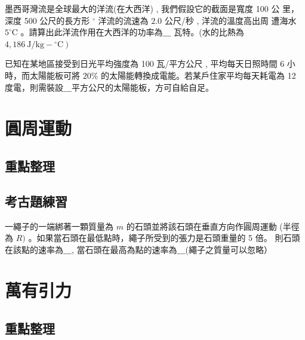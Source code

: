 \documentclass[cn,10pt,math=newtx,chinesefont=founder]{../elegantbook}
\begin{document}
\begin{example}
    墨西哥灣流是全球最大的洋流(在大西洋) , 我們假設它的截面是寬度 100 公 里，深度 500 公尺的長方形 $^{\circ}$ 洋流的流速為 $2.0$ 公尺/秒 , 洋流的溫度高出周 遭海水 $5^{\circ} \mathrm{C}$ 。請算出此洋流作用在大西洋的功率為$\_\_\_$ 瓦特。(水的比熱為 $\left.4,186 \mathrm{~J} / \mathrm{kg}-{ }^{\circ} \mathrm{C}\right)$
\end{example}
\begin{solution}

\end{solution}
\vspace{6cm}

\begin{example}
     已知在某地區接受到日光平均強度為 100 瓦/平方公尺 , 平均每天日照時間 6 小時，而太陽能板可將 $20 \%$ 的太陽能轉換成電能。若某戶住家平均每天耗電為 12 度電，則需裝設$\_\_\_$平方公尺的太陽能板，方可自給自足。
\end{example}
\begin{solution}
    
\end{solution}
\vspace{6cm}
\section{圓周運動}
\subsection{重點整理}
\newpage
\subsection{考古題練習}
\begin{example}
    一繩子的一端綁著一顆質量為 $m$ 的石頭並將該石頭在垂直方向作圓周運動 (半徑為 $R)$ 。如果當石頭在最低點時，繩子所受到的張力是石頭重量的 5 倍。 則石頭在該點的速率為$\_\_\_$, 當石頭在最高為點的速率為$\_\_\_$(繩子之質量可以忽略）
\end{example}
\begin{solution}
    
\end{solution}
\vspace{6cm}
\section{萬有引力}
\subsection{重點整理}
\newpage
\end{document}
